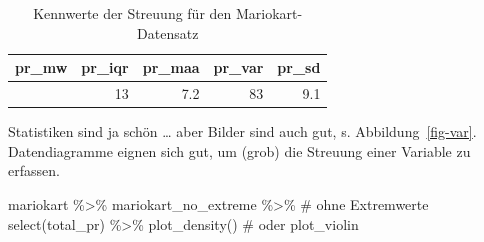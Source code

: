 \documentclass[
  letterpaper,
  oneside,
  open=any]{scrbook}
\newenvironment{Shaded}{\begin{snugshade}}{\end{snugshade}}
\newcommand{\CommentTok}[1]{\textcolor[rgb]{0.37,0.37,0.37}{#1}}
\newcommand{\FunctionTok}[1]{\textcolor[rgb]{0.28,0.35,0.67}{#1}}
\newcommand{\NormalTok}[1]{\textcolor[rgb]{0.00,0.23,0.31}{#1}}
\newcommand{\SpecialCharTok}[1]{\textcolor[rgb]{0.37,0.37,0.37}{#1}}
\theoremstyle{definition}
\theoremstyle{definition}
\theoremstyle{definition}
\theoremstyle{remark}
\begin{document}
\begin{longtable}[]{@{}rrrrr@{}}

\caption{\label{tbl-mario-streu}Kennwerte der Streuung für den
Mariokart-Datensatz}

\tabularnewline

\toprule\noalign{}
pr\_mw & pr\_iqr & pr\_maa & pr\_var & pr\_sd \\
\midrule\noalign{}
\endhead
\bottomrule\noalign{}
\endlastfoot
47 & 13 & 7.2 & 83 & 9.1 \\

\end{longtable}

Statistiken sind ja schön \ldots{} aber Bilder sind auch gut, s.
Abbildung~\ref{fig-var}. Datendiagramme eignen sich gut, um (grob) die
Streuung einer Variable zu erfassen.

\begin{Shaded}
\begin{Highlighting}[]
\NormalTok{mariokart }\SpecialCharTok{\%\textgreater{}\%} 
\NormalTok{  mariokart\_no\_extreme }\SpecialCharTok{\%\textgreater{}\%}   \CommentTok{\# ohne Extremwerte}
  \FunctionTok{select}\NormalTok{(total\_pr) }\SpecialCharTok{\%\textgreater{}\%} 
  \FunctionTok{plot\_density}\NormalTok{()  }\CommentTok{\# oder plot\_violin}
\end{Highlighting}
\end{Shaded}
\end{document}

